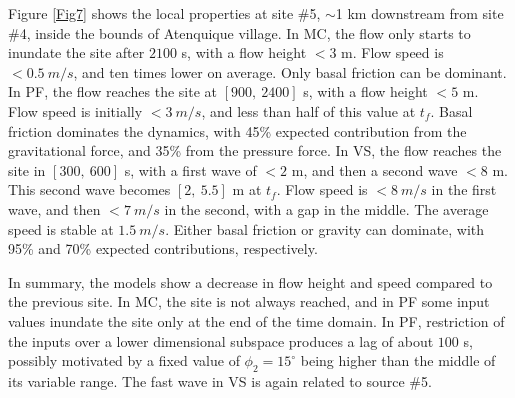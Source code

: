 \documentclass[nhess, manuscript]{copernicus}
\begin{document}
Figure \ref{Fig7} shows the local properties at site \#5, $\sim$1 km downstream from site \#4, inside the bounds of Atenquique village. In MC, the flow only starts to inundate the site after $2100$ s, with a flow height $<3$ m. Flow speed is $<0.5\ m/s$, and ten times lower on average. Only basal friction can be dominant. In PF, the flow reaches the site at $[900,\ 2400]$ s, with a flow height $<5$ m. Flow speed is initially $<3\ m/s$, and less than half of this value at $t_f$. Basal friction dominates the dynamics, with 45\% expected contribution from the gravitational force, and 35\% from the pressure force. In VS, the flow reaches the site in $[300,\ 600]$ s, with a first wave of $<2$ m, and then a second wave $<8$ m. This second wave becomes $[2,\ 5.5]$ m at $t_f$. Flow speed is $<8\ m/s$ in the first wave, and then $<7\ m/s$ in the second, with a gap in the middle. The average speed is stable at $1.5\ m/s$. Either basal friction or gravity can dominate, with 95\% and 70\% expected contributions, respectively.

In summary, the models show a decrease in flow height and speed compared to the previous site. In MC, the site is not always reached, and in PF some input values inundate the site only at the end of the time domain. In PF,  restriction of the inputs over a lower dimensional subspace produces a lag of about $100$ s, possibly motivated by a fixed value of $\phi_2=15^\circ$ being higher than the middle of its variable range. The fast wave in VS is again related to source \#5.
\end{document}
